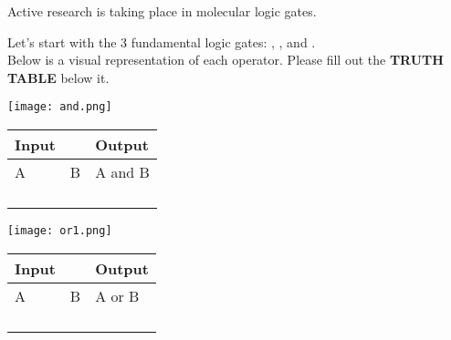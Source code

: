 \documentclass[11pt]{report}
\begin{document}
\vspace{2mm}
\quad Active research is taking place in molecular logic gates.
\vspace{2mm}


\pagebreak

\begin{center}
	Let's start with the 3 fundamental logic gates: , , and  . \\Below is a visual representation of each operator.  Please fill out the \textbf{TRUTH TABLE} below it.
\end{center}


\vspace{20mm}
\hspace{1in}
\begin{minipage}{.5\linewidth}
	\texttt{[image: and.png]}
	\label{img2}
\end{minipage}
\begin{minipage}{\linewidth}
\begin{tabular}{|ll|l|}
	\hline
	Input                   &   & Output  \\ \hline
	\multicolumn{1}{|l|}{A} & B & A and B \\ \hline
	\multicolumn{1}{|l|}{}  &   &         \\ \hline
	\multicolumn{1}{|l|}{}  &   &         \\ \hline
	\multicolumn{1}{|l|}{}  &   &         \\ \hline
	\multicolumn{1}{|l|}{}  &   &         \\ \hline
\end{tabular}
\end{minipage}


\vspace{20mm}
\hspace{1in}
\begin{minipage}{.5\linewidth}
	\texttt{[image: or1.png]}
	\label{img2}
\end{minipage}
\begin{minipage}{\linewidth}
\begin{tabular}{|ll|l|}
	\hline
	Input                   &   & Output \\ \hline
	\multicolumn{1}{|l|}{A} & B & A or B \\ \hline
	\multicolumn{1}{|l|}{}  &   &        \\ \hline
	\multicolumn{1}{|l|}{}  &   &        \\ \hline
	\multicolumn{1}{|l|}{}  &   &        \\ \hline
	\multicolumn{1}{|l|}{}  &   &        \\ \hline
\end{tabular}

\end{minipage}
\end{document}
